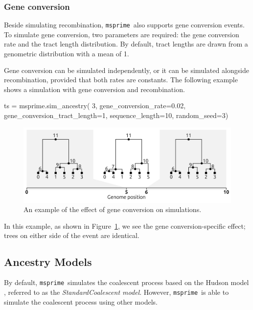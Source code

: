 \documentclass[graybox]{svmult}
\newcommand{\msprime}[0]{\texttt{msprime}}
\begin{document}
\subsubsection{Gene conversion}\label{gene-conversion}

Beside simulating recombination, \msprime\ also supports gene conversion events. To simulate gene conversion,
two parameters are required: the gene conversion rate and the tract length distribution. By default, tract lengths are drawn
from a genometric distribution with a mean of 1.

Gene conversion can be simulated independently, or it can be simulated alongside recombination, provided that both rates are constants.
The following example shows a simulation with gene conversion and recombination.

\begin{pythoncode}
ts = msprime.sim_ancestry(
    3, gene_conversion_rate=0.02, gene_conversion_tract_length=1,
    sequence_length=10, random_seed=3)
\end{pythoncode}

\begin{figure}
\begin{center}
\includegraphics[width=\textwidth]{images/gene_conversion.pdf}
\end{center}
\caption{\label{fig:gene_conversion} An example of the effect of gene conversion on simulations.}
\end{figure}

In this example, as shown in Figure~\ref{fig:gene_conversion}, we see the gene conversion-specific effect; trees on either side of the event are identical.

\subsection{Ancestry Models}\label{ancestry-models}

By default, \msprime\ simulates the coalescent process based on the Hudson model \citep{hudson1983properties}, referred to as the
\emph{StandardCoalescent model}. However, \msprime\ is able to simulate the coalescent process using other models.
\end{document}
